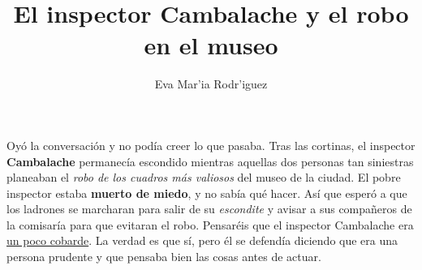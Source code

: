 \documentclass{article}
\begin{document}
	\title{El inspector Cambalache y el robo en el museo}
	\author{Eva Mar'ia Rodr'iguez}
	\maketitle
	Oy\'o la conversaci\'on y no pod\'ia creer lo que pasaba. Tras las cortinas, el inspector 
	\textbf{Cambalache} permanec\'ia escondido mientras aquellas dos personas tan siniestras 
	planeaban el \textit{robo de los cuadros m\'as valiosos} del museo de la ciudad. El pobre 
	inspector estaba \textbf{muerto de miedo}, y no sab\'ia qu\'e hacer. As\'i que esper\'o a que los 
	ladrones se marcharan para salir de su \textit{escondite} y avisar a sus compa\~neros de la 
	comisar\'ia para que evitaran el robo. Pensar\'eis que el inspector Cambalache era 
	\underline{un poco cobarde}. La verdad es que s\'i, pero \'el se defend\'ia diciendo que era una 
	persona prudente y que pensaba bien las cosas antes de actuar.
\end{document}
